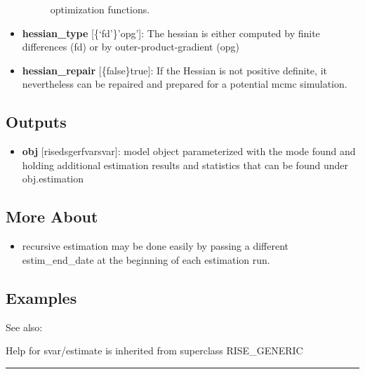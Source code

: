 \documentclass[letterpaper,10pt,english]{sphinxmanual}
\begin{document}
\begin{itemize}
\begin{description}
\begin{itemize}
\end{itemize}

optimization functions.

\end{description}

\item {} 
\textbf{hessian\_type} {[}\{`fd'\}\textbar{}'opg'{]}: The hessian is either computed by
finite differences (fd) or by outer-product-gradient (opg)

\item {} 
\textbf{hessian\_repair} {[}\{false\}\textbar{}true{]}: If the Hessian is not positive
definite, it nevertheless can be repaired and prepared for a potential
mcmc simulation.

\end{itemize}


\subsection{Outputs}
\label{classes/models/@svar/svar:id11}\begin{itemize}
\item {} 
\textbf{obj} {[}rise\textbar{}dsge\textbar{}rfvar\textbar{}svar{]}: model object parameterized with the
mode found and holding additional estimation results and statistics
that can be found under obj.estimation

\end{itemize}


\subsection{More About}
\label{classes/models/@svar/svar:id12}\begin{itemize}
\item {} 
recursive estimation may be done easily by passing a different
estim\_end\_date at the beginning of each estimation run.

\end{itemize}


\subsection{Examples}
\label{classes/models/@svar/svar:id13}
See also:

Help for svar/estimate is inherited from superclass RISE\_GENERIC


\bigskip\hrule{}\bigskip
\end{document}
